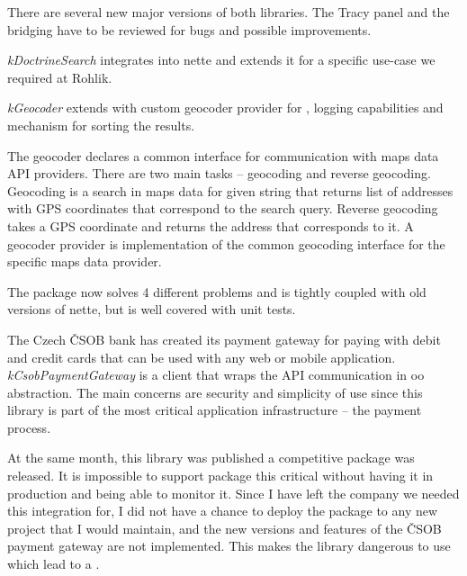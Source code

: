 There are several new major versions of both libraries. The Tracy panel and the bridging have to be reviewed for bugs and possible improvements.

 \label{sec:state:doctrine-search}

\textit{\gls{kDoctrineSearch}} integrates  into \gls{nette} and extends it for a specific use-case we required at Rohlik.

 \label{sec:state:geocoder}

\textit{\gls{kGeocoder}} extends  with custom geo\-co\-de\-r provider for , logging capabilities and mechanism for sorting the results.

The geo\-co\-de\-r declares a common interface for communication with maps data API providers. There are two main tasks -- geocoding and reverse geocoding. Geocoding is a search in maps data for given string that returns list of addresses with GPS coordinates that correspond to the search query. Reverse geocoding takes a GPS coordinate and returns the address that corresponds to it. A geo\-co\-de\-r provider is implementation of the common geocoding interface for the specific maps data provider.

The package now solves 4 different problems and is tightly coupled with old versions of \gls{nette}, but is well covered with unit tests.

 \label{sec:state:csob-payment-gateway}

The Czech ČSOB bank has created its payment gateway for paying with debit and credit cards that can be used with any web or mobile application. \textit{\gls{kCsobPaymentGateway}} is a client that wraps the API communication in \gls{oo} abstraction. The main concerns are security and simplicity of use since this library is part of the most critical application infrastructure -- the payment process.

At the same month, this library was published a competitive package  was released. It is impossible to support package this critical without having it in production and being able to monitor it. Since I have left the company we needed this integration for, I did not have a chance to deploy the package to any new project that I would maintain, and the new versions and features of the ČSOB payment gateway are not implemented. This makes the library dangerous to use which lead to a .

